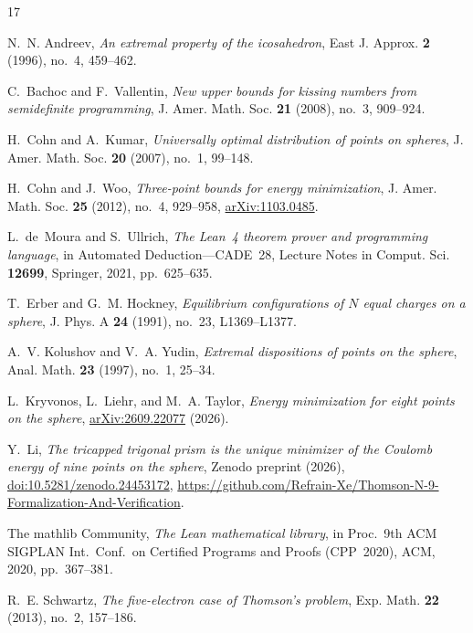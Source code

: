 \documentclass[11pt,reqno]{amsart}
\renewcommand{\_}{\origunderscore\allowbreak}
\theoremstyle{definition}
\begin{document}
\begin{thebibliography}{17}

N.~N. Andreev,
\emph{An extremal property of the icosahedron},
East J. Approx. \textbf{2} (1996), no.~4, 459--462.

C.~Bachoc and F.~Vallentin,
\emph{New upper bounds for kissing numbers from semidefinite programming},
J. Amer. Math. Soc. \textbf{21} (2008), no.~3, 909--924.

H.~Cohn and A.~Kumar,
\emph{Universally optimal distribution of points on spheres},
J. Amer. Math. Soc. \textbf{20} (2007), no.~1, 99--148.

H.~Cohn and J.~Woo,
\emph{Three-point bounds for energy minimization},
J. Amer. Math. Soc. \textbf{25} (2012), no.~4, 929--958,
\href{https://arxiv.org/abs/1103.0485}{arXiv:1103.0485}.

L.~de~Moura and S.~Ullrich,
\emph{The Lean~4 theorem prover and programming language},
in Automated Deduction---CADE~28, Lecture Notes in Comput. Sci. \textbf{12699},
Springer, 2021, pp.~625--635.

T.~Erber and G.~M. Hockney,
\emph{Equilibrium configurations of $N$ equal charges on a sphere},
J. Phys. A \textbf{24} (1991), no.~23, L1369--L1377.

A.~V. Kolushov and V.~A. Yudin,
\emph{Extremal dispositions of points on the sphere},
Anal. Math. \textbf{23} (1997), no.~1, 25--34.

L.~Kryvonos, L.~Liehr, and M.~A. Taylor,
\emph{Energy minimization for eight points on the sphere},
\href{https://arxiv.org/abs/2609.22077}{arXiv:2609.22077} (2026).

Y.~Li,
\emph{The tricapped trigonal prism is the unique minimizer of the Coulomb energy of nine points on the sphere},
Zenodo preprint (2026),
\href{https://doi.org/10.5281/zenodo.24453172}{doi:10.5281/zenodo.24453172},
\url{https://github.com/Refrain-Xe/Thomson-N-9-Formalization-And-Verification}.

The mathlib Community,
\emph{The Lean mathematical library},
in Proc.\ 9th ACM SIGPLAN Int.\ Conf.\ on Certified Programs and Proofs (CPP~2020),
ACM, 2020, pp.~367--381.

R.~E. Schwartz,
\emph{The five-electron case of Thomson's problem},
Exp. Math. \textbf{22} (2013), no.~2, 157--186.


\end{thebibliography}
\end{document}
